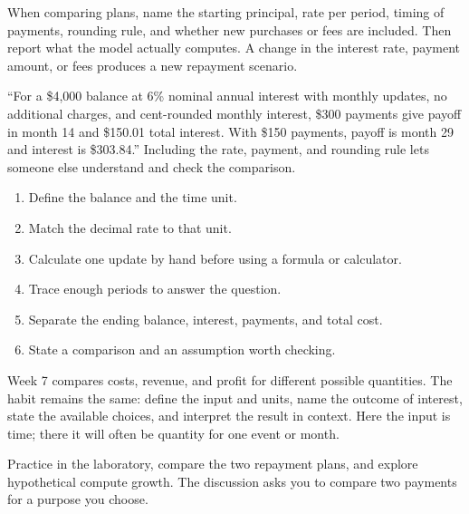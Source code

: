 \documentclass[11pt,letterpaper]{article}
\begin{document}
When comparing plans, name the starting principal, rate per period, timing of payments, rounding rule, and whether new purchases or fees are included. Then report what the model actually computes. A change in the interest rate, payment amount, or fees produces a new repayment scenario.


\begin{tcolorbox}[title={Example \textperiodcentered{} A complete comparison statement},breakable]

``For a \$4,000 balance at 6\% nominal annual interest with monthly updates, no additional charges, and cent-rounded monthly interest, \$300 payments give payoff in month 14 and \$150.01 total interest. With \$150 payments, payoff is month 29 and interest is \$303.84.'' Including the rate, payment, and rounding rule lets someone else understand and check the comparison.


\end{tcolorbox}

\begin{enumerate}
\item Define the balance and the time unit.
\item Match the decimal rate to that unit.
\item Calculate one update by hand before using a formula or calculator.
\item Trace enough periods to answer the question.
\item Separate the ending balance, interest, payments, and total cost.
\item State a comparison and an assumption worth checking.

\end{enumerate}

\begin{tcolorbox}[title={Prepare for Week 7},breakable,colback=warm,colbacktitle=warm,coltitle=gold,colframe=gold!35]

Week 7 compares costs, revenue, and profit for different possible quantities. The habit remains the same: define the input and units, name the outcome of interest, state the available choices, and interpret the result in context. Here the input is time; there it will often be quantity for one event or month.


\end{tcolorbox}

Practice in the laboratory, compare the two repayment plans, and explore hypothetical compute growth. The discussion asks you to compare two payments for a purpose you choose.
\end{document}
